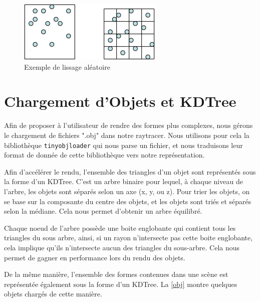 \documentclass{article}
\begin{document}
\begin{figure}[h]
\begin{center}
  \includegraphics{images/smoothing.png}
  \caption{Exemple de lissage aléatoire\label{smooth}}
\end{center}
\end{figure}


\section{Chargement d'Objets et KDTree}

Afin de proposer à l'utilisateur de rendre des formes plus complexes, nous
gérons le chargement de fichiers ".obj" dans notre raytracer. Nous utilisons
pour cela la bibliothèque \texttt{tinyobjloader} qui nous parse un fichier, et
nous traduisons leur format de donnée de cette bibliothèque vers notre
représentation.

Afin d'accélérer le rendu, l'ensemble des triangles d'un objet sont représentés
sous la forme d'un KDTree. C'est un arbre binaire pour lequel, à chaque niveau
de l'arbre, les objets sont séparés selon un axe (x, y, ou z). Pour trier les
objets, on se base sur la composante du centre des objets, et les objets sont
triés et séparés selon la médiane. Cela nous permet d'obtenir un arbre
équilibré.

Chaque noeud de l'arbre possède une boite englobante qui contient tous les
triangles du sous arbre, ainsi, si un rayon n'intersecte pas cette boite
englobante, cela implique qu'ils n'intersecte aucun des triangles du
sous-arbre. Cela nous permet de gagner en performance lors du rendu des objets.

De la même manière, l'ensemble des formes contenues dans une scène est
représentée également sous la forme d'un KDTree. La \cref{obj} montre
quelques objets chargés de cette manière.
\end{document}
